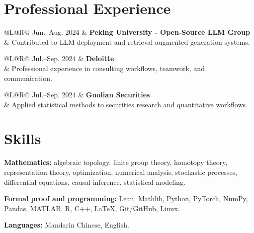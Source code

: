 \documentclass[9pt,letterpaper]{extarticle}
\makeatletter
\newcommand{\entry}[4]{%
  \begin{tabularx}{\linewidth}{@{}L@{\hspace{0.035\linewidth}}R@{}}
  #1 & {\bfseries #2}\hfill {\sffamily\footnotesize\color{muted}#3}\\[-0.15em]
     & #4
  \end{tabularx}\vspace{0.18em}
}
\newcommand{\skill}[2]{\textbf{#1:} #2\par\vspace{0.05em}}
\makeatother
\begin{document}
\section{Professional Experience}
\entry{Jun.--Aug. 2024}{Peking University - Open-Source LLM Group}{}{Contributed to LLM deployment and retrieval-augmented generation systems.}
\entry{Jul.--Sep. 2024}{Deloitte}{}{Professional experience in consulting workflows, teamwork, and communication.}
\entry{Jul.--Sep. 2024}{Guolian Securities}{}{Applied statistical methods to securities research and quantitative workflows.}

\section{Skills}
\skill{Mathematics}{algebraic topology, finite group theory, homotopy theory, representation theory, optimization, numerical analysis, stochastic processes, differential equations, causal inference, statistical modeling.}
\skill{Formal proof and programming}{Lean, Mathlib, Python, PyTorch, NumPy, Pandas, MATLAB, R, C++, LaTeX, Git/GitHub, Linux.}
\skill{Languages}{Mandarin Chinese, English.}
\end{document}
